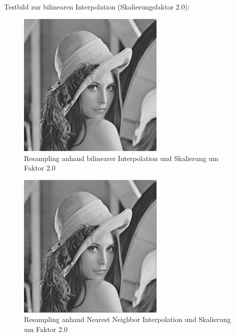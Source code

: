 \documentclass[12pt,german]{article}
\begin{document}
Testbild zur bilinearen Interpolation (Skalierungsfaktor 2.0):

\begin{figure}[H]
	\centering
	\includegraphics[width=7cm]{images/bilineare-interpolation-final/bip-scaled-2.jpg}
	\caption{Resampling anhand bilinearer Interpolation und Skalierung um Faktor 2.0}
	\label{fig:resultResamplingBilinearInterpolation-2.0}
\end{figure}

\begin{figure}[H]
	\centering
	\includegraphics[width=7cm]{images/bilineare-interpolation-final/nn-scaled-2.jpeg}
	\caption{Resampling anhand Nearest Neighbor Interpolation und Skalierung um Faktor 2.0}
	\label{fig:resultResamplingNNInterpolation-2.0}
\end{figure}
\end{document}
